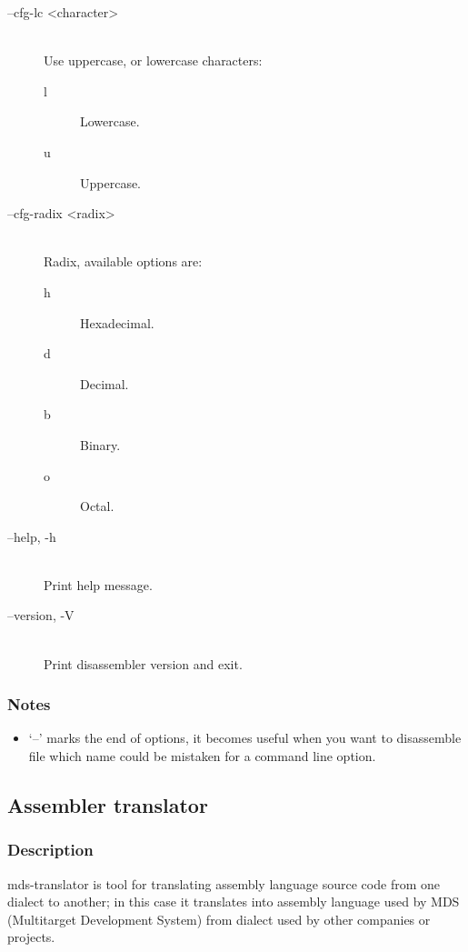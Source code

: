 \begin{description}
                \item[--cfg-lc <character>]~\\
                    Use uppercase, or lowercase characters:
                    \begin{description}
                        \item [l] Lowercase.
                        \item [u] Uppercase.
                    \end{description}

                \item[--cfg-radix <radix>]~\\
                    Radix, available options are:
                    \begin{description}
                        \item [h] Hexadecimal.
                        \item [d] Decimal.
                        \item [b] Binary.
                        \item [o] Octal.
                    \end{description}

                \item[--help, -h]~\\
                    Print help message.

                \item[--version, -V]~\\
                    Print disassembler version and exit.
            \end{description}

        \subsubsection{Notes}
            \begin{itemize}
                \item `--' marks the end of options, it becomes useful when you want to disassemble file which name could be mistaken for a command line option.
            \end{itemize}

    \subsection{Assembler translator}
        \subsubsection{Description}
            mds-translator is tool for translating assembly language source code from one dialect to another; in this case it translates into assembly language used by MDS (Multitarget Development System) from dialect used by other companies or projects.

